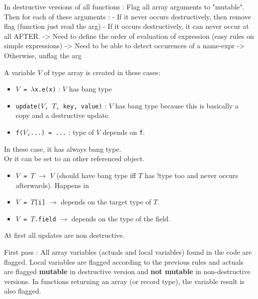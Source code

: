 \documentclass[12pt,a4paper]{article}
\newcommand{\cl}[1]{\texttt{#1}}
\begin{document}
In destructive versions of all functions :
Flag all array arguments to "mutable".
Then for each of these arguments :
  - If it never occurs destructively, then remove flag
          (function just read the arg)
  - If it occurs destructively, it can never occur at all AFTER.
  -> Need to define the order of evaluation of expression
      (easy rules on simple expressions)
  -> Need to be able to detect occurences of a name-expr
  -> Otherwise, unflag the arg

A variable $V$ of type array is created in these cases:
\begin{itemize}
\item \cl{$V$ = $\lambda$x.e(x)} : $V$ has bang type
\item \cl{update($V$, $T$, key, value)} : $V$ has bang type because this is basically a copy and a destructive update.
\item \cl{f($V$,...) = ...} : type of $V$ depends on \cl{f}.
\end{itemize}
In these case, it has always bang type.\\
Or it can be set to an other referenced object.
\begin{itemize}
\item \cl{$V$ = $T$} $\rightarrow$ $V$ (should have bang type iff $T$ has !type too and never occurs afterwards). Happens in 
\item \cl{$V$ = $T$[i]} $\rightarrow$ depends on the target type of $T$.
\item \cl{$V$ = $T$.field} $\rightarrow$ depends on the type of the field.
\end{itemize}
At first all updates are non destructive.

First pass : All array variables (actuals and local variables) found in the code are flagged. Local variables are flagged according to the previous rules and actuals are flagged \textbf{mutable} in destructive version and \textbf{not mutable} in non-destructive versions. In functions returning an array (or record type), the variable result is also flagged.\\
\end{document}
